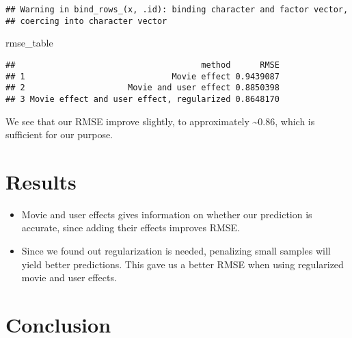 \documentclass[]{article}
\newenvironment{Shaded}{\begin{snugshade}}{\end{snugshade}}
\newcommand{\KeywordTok}[1]{\textcolor[rgb]{0.13,0.29,0.53}{\textbf{#1}}}
\newcommand{\DataTypeTok}[1]{\textcolor[rgb]{0.13,0.29,0.53}{#1}}
\newcommand{\StringTok}[1]{\textcolor[rgb]{0.31,0.60,0.02}{#1}}
\newcommand{\OperatorTok}[1]{\textcolor[rgb]{0.81,0.36,0.00}{\textbf{#1}}}
\newcommand{\NormalTok}[1]{#1}
\providecommand{\tightlist}{%
  \setlength{\itemsep}{0pt}\setlength{\parskip}{0pt}}
\begin{document}
\begin{Shaded}
\end{Shaded}

\begin{verbatim}
## Warning in bind_rows_(x, .id): binding character and factor vector,
## coercing into character vector
\end{verbatim}

\begin{Shaded}
\begin{Highlighting}[]
\NormalTok{rmse_table}
\end{Highlighting}
\end{Shaded}

\begin{verbatim}
##                                      method      RMSE
## 1                              Movie effect 0.9439087
## 2                     Movie and user effect 0.8850398
## 3 Movie effect and user effect, regularized 0.8648170
\end{verbatim}

We see that our RMSE improve slightly, to approximately
\textasciitilde{}0.86, which is sufficient for our purpose.

\section{Results}\label{results}

\begin{itemize}
\tightlist
\item
  Movie and user effects gives information on whether our prediction is
  accurate, since adding their effects improves RMSE.
\item
  Since we found out regularization is needed, penalizing small samples
  will yield better predictions. This gave us a better RMSE when using
  regularized movie and user effects.
\end{itemize}

\section{Conclusion}\label{conclusion}
\end{document}
